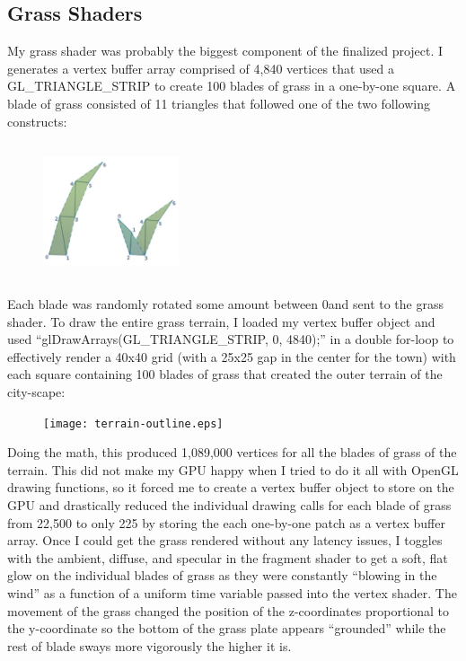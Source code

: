 \documentclass[journal,10pt,onecolumn,compsoc]{IEEEtran}
\begin{document}
\subsection{Grass Shaders}\label{sec:grass}
\noindent My grass shader was probably the biggest component of the finalized project. I generates a vertex buffer array comprised of 4,840 vertices that used a GL\_TRIANGLE\_STRIP to create 100 blades of grass in a one-by-one square. A blade of grass consisted of 11 triangles that followed one of the two following constructs:
\begin{center} 
    \begin{figure}[H]
        \centering
        \includegraphics[width=4cm,height=4cm]{grass-diagram.eps}
    \end{figure}
\end{center}  
Each blade was randomly rotated some amount between 0\textdegree and sent to the grass shader. To draw the entire grass terrain, I loaded my vertex buffer object and used ``glDrawArrays(GL\_TRIANGLE\_STRIP, 0, 4840);'' in a double for-loop to effectively render a 40x40 grid (with a 25x25 gap in the center for the town) with each square containing 100 blades of grass that created the outer terrain of the city-scape:
\begin{center} 
    \begin{figure}[H]
        \centering
        \texttt{[image: terrain-outline.eps]}
    \end{figure}
\end{center} 
Doing the math, this produced 1,089,000 vertices for all the blades of grass of the terrain. This did not make my GPU happy when I tried to do it all with OpenGL drawing functions, so it forced me to create a vertex buffer object to store on the GPU and drastically reduced the individual drawing calls for each blade of grass from 22,500 to only 225 by storing the each one-by-one patch as a vertex buffer array. Once I could get the grass rendered without any latency issues, I toggles with the ambient, diffuse, and specular in the fragment shader to get a soft, flat glow on the individual blades of grass as they were constantly ``blowing in the wind'' as a function of a uniform time variable passed into the vertex shader. The movement of the grass changed the position of the z-coordinates proportional to the y-coordinate so the bottom of the grass plate appears ``grounded'' while the rest of blade sways more vigorously the higher it is.
\end{document}
